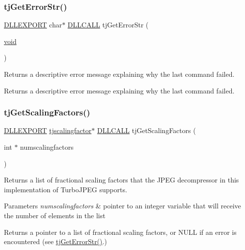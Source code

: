 \subsubsection{\texorpdfstring{tj\+Get\+Error\+Str()}{tjGetErrorStr()}}
{\footnotesize\ttfamily \hyperlink{turbojpeg_8h_a808e08638be3cba36e36759e5b150de0}{D\+L\+L\+E\+X\+P\+O\+RT} char$\ast$ \hyperlink{turbojpeg_8h_a54b25836118bfac94a53a7b790f3ccb2}{D\+L\+L\+C\+A\+LL} tj\+Get\+Error\+Str (\begin{DoxyParamCaption}\item[{\hyperlink{png_8h_ac9c84fa68bbad002983e35ce3663c686}{void}}]{ }\end{DoxyParamCaption})}

Returns a descriptive error message explaining why the last command failed.

\begin{DoxyReturn}{Returns}
a descriptive error message explaining why the last command failed. 
\end{DoxyReturn}
\mbox{\label{group___turbo_j_p_e_g_ga6449044b9af402999ccf52f401333be8}} 
\subsubsection{\texorpdfstring{tj\+Get\+Scaling\+Factors()}{tjGetScalingFactors()}}
{\footnotesize\ttfamily \hyperlink{turbojpeg_8h_a808e08638be3cba36e36759e5b150de0}{D\+L\+L\+E\+X\+P\+O\+RT} \hyperlink{structtjscalingfactor}{tjscalingfactor}$\ast$ \hyperlink{turbojpeg_8h_a54b25836118bfac94a53a7b790f3ccb2}{D\+L\+L\+C\+A\+LL} tj\+Get\+Scaling\+Factors (\begin{DoxyParamCaption}\item[{int $\ast$}]{numscalingfactors }\end{DoxyParamCaption})}

Returns a list of fractional scaling factors that the J\+P\+EG decompressor in this implementation of Turbo\+J\+P\+EG supports.


\begin{DoxyParams}{Parameters}
{\em numscalingfactors} & pointer to an integer variable that will receive the number of elements in the list\\
\hline
\end{DoxyParams}
\begin{DoxyReturn}{Returns}
a pointer to a list of fractional scaling factors, or N\+U\+LL if an error is encountered (see \hyperlink{group___turbo_j_p_e_g_ga9af79c908ec131b1ae8d52fe40375abf}{tj\+Get\+Error\+Str()}.) 
\end{DoxyReturn}
\mbox{\label{group___turbo_j_p_e_g_ga3d10c47fbe4a2489a2b30c931551d01a}} 

